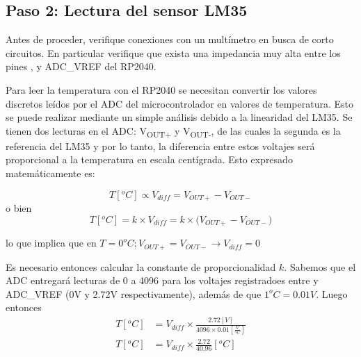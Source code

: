 %
%



\subsection{Paso 2: Lectura del sensor LM35}%
\label{sec:step2}
Antes de proceder, verifique conexiones con un multímetro en busca de corto circuitos.
En particular verifique que exista una impedancia muy alta entre los pines \VCC, \GND y \textsc{ADC\_VREF} del RP2040.

Para leer la temperatura con el RP2040 se necesitan convertir los valores discretos leídos por el ADC del microcontrolador en valores de temperatura.
Esto se puede realizar mediante un simple análisis debido a la linearidad del LM35.
Se tienen dos lecturas en el ADC: V\textsubscript{OUT+} y V\textsubscript{OUT-}, de las cuales la segunda es la referencia del LM35 y por lo tanto, la diferencia entre estos voltajes será proporcional a la temperatura en escala centígrada.
Esto expresado matemáticamente es:

\begin{equation*}
	T[^{o}C] \propto V_{diff} = V_{OUT+}-V_{OUT-}
\end{equation*}
\noindent o bien
\begin{equation*}
	T[^{o}C] = k \times V_{diff} = k \times \big( V_{OUT+}-V_{OUT-} \big)
\end{equation*}

\noindent lo que implica que en $T = 0^{o}C; V_{OUT+}=V_{OUT-} \rightarrow V_{diff} = 0$

\medskip
Es necesario entonces calcular la constante de proporcionalidad $k$.
Sabemos que el ADC entregará lecturas de 0 a 4096 para los voltajes registradoes entre \GND y {ADC\_VREF} (0V y 2.72V respectivamente), además de que $1^{o}C = 0.01V$.
Luego entonces
\begin{align*}
	T[^{o}C] &= V_{diff} \times \frac{2.72[V]}{ 4096 \times 0.01[\tfrac{V}{^{o}C}] }  \\
	T[^{o}C] &= V_{diff} \times \frac{2.72}{ 40.96 }[^{o}C]  \\
\end{align*}

